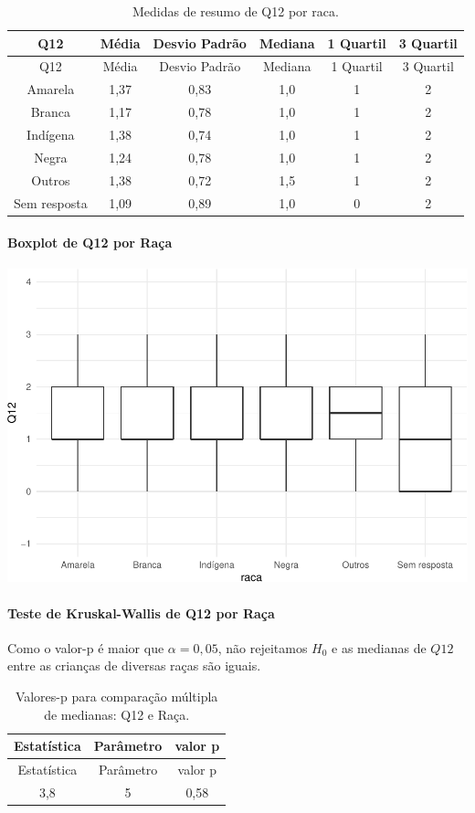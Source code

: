 \documentclass[]{article}
\let\oldparagraph\paragraph
\renewcommand{\paragraph}[1]{\oldparagraph{#1}\mbox{}}
\begin{document}
\begin{longtable}[]{@{}cccccc@{}}
\caption{\label{tab:unnamed-chunk-41}Medidas de resumo de Q12 por raca.}\tabularnewline
\toprule
Q12 & Média & Desvio Padrão & Mediana & 1 Quartil & 3 Quartil\tabularnewline
\midrule
\endfirsthead
\toprule
Q12 & Média & Desvio Padrão & Mediana & 1 Quartil & 3 Quartil\tabularnewline
\midrule
\endhead
Amarela & 1,37 & 0,83 & 1,0 & 1 & 2\tabularnewline
Branca & 1,17 & 0,78 & 1,0 & 1 & 2\tabularnewline
Indígena & 1,38 & 0,74 & 1,0 & 1 & 2\tabularnewline
Negra & 1,24 & 0,78 & 1,0 & 1 & 2\tabularnewline
Outros & 1,38 & 0,72 & 1,5 & 1 & 2\tabularnewline
Sem resposta & 1,09 & 0,89 & 1,0 & 0 & 2\tabularnewline
\bottomrule
\end{longtable}

\hypertarget{boxplot-de-q12-por-rauxe7a}{%
\paragraph{Boxplot de Q12 por Raça}\label{boxplot-de-q12-por-rauxe7a}}

\begin{center}\includegraphics[width=0.75\linewidth]{relatorio_files/figure-latex/unnamed-chunk-42-1} \end{center}

\hypertarget{teste-de-kruskal-wallis-de-q12-por-rauxe7a}{%
\paragraph{Teste de Kruskal-Wallis de Q12 por Raça}\label{teste-de-kruskal-wallis-de-q12-por-rauxe7a}}

Como o valor-p é maior que \(\alpha=0,05\), não rejeitamos \(H_0\) e as medianas de \(Q12\) entre as crianças de diversas raças são iguais.

\begin{longtable}[]{@{}ccc@{}}
\caption{\label{tab:unnamed-chunk-43}Valores-p para comparação múltipla de medianas: Q12 e Raça.}\tabularnewline
\toprule
Estatística & Parâmetro & valor p\tabularnewline
\midrule
\endfirsthead
\toprule
Estatística & Parâmetro & valor p\tabularnewline
\midrule
\endhead
3,8 & 5 & 0,58\tabularnewline
\bottomrule
\end{longtable}
\end{document}
